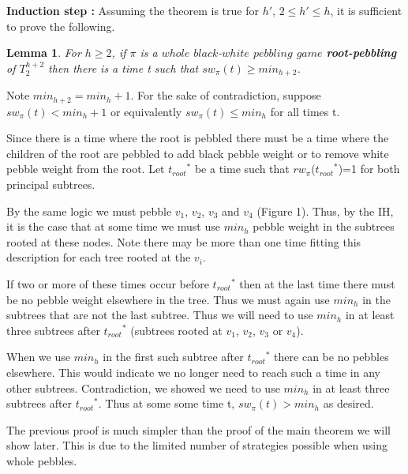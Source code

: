\documentclass[12pt]{article}
\newenvironment{proof}{\noindent {\bf Proof:} \hspace{.4em}}
                      {\hspace{\fill}{$\blacksquare$} \smallskip}
\newtheorem{lemma}[theorem]{Lemma}
\newcommand{\troots}{{t_{root}}^*}
\begin{document}
\noindent
{\bf Induction step :}  Assuming the theorem is true for  $h'$,
$2 \le h' \le h$, it is sufficient to prove the following.

\begin{lemma} \label{bwlb3}
For $h\geq2$, if $\pi$ is a $whole$ $black$-$white$ $pebbling$ $game$ {\bf root-pebbling} of $T_2^{h+2}$ then there is a time t such that $sw_\pi(t) \geq min_{h+2}$.
\end{lemma}


\begin{proof} 

Note $min_{h+2} = min_h + 1$. For the sake of contradiction, suppose $sw_\pi(t) < min_{h} + 1$ or equivalently $sw_\pi(t) \leq min_{h}$ for all times t.
 
Since there is a time where the root is pebbled there must be a time where the children of the root are pebbled to add black pebble weight or to remove white pebble weight from the root. Let $\troots$ be a time such that $rw_\pi$($\troots$)=1 for both principal subtrees.
 
By the same logic we must pebble $v_1$, $v_2$, $v_3$ and $v_4$ (Figure 1). Thus, by the IH, it is the case that at some time we must use $min_h$ pebble weight in the subtrees rooted at these nodes. Note there may be more than one time fitting this description for each tree rooted at the $v_i$.

If two or more of these times occur before $\troots$ then at the last time there must be no pebble weight elsewhere in the tree. Thus we must again use $min_h$ in the subtrees that are not the last subtree.  Thus we will need to use $min_h$ in at least three subtrees after $\troots$ (subtrees rooted at $v_1$, $v_2$, $v_3$ or $v_4$).

When we use $min_h$ in the first such subtree after $\troots$ there can be no pebbles elsewhere. This would indicate we no longer need to reach such a time in any other subtrees. Contradiction, we showed we need to use $min_h$ in at least three subtrees after $\troots$. Thus at some some time t, $sw_\pi(t) > min_{h}$ as desired.\\
 \end{proof} 
 
 The previous proof is much simpler than the proof of the main theorem we will show later. This is due to the limited number of strategies possible when using whole pebbles.
\end{document}
